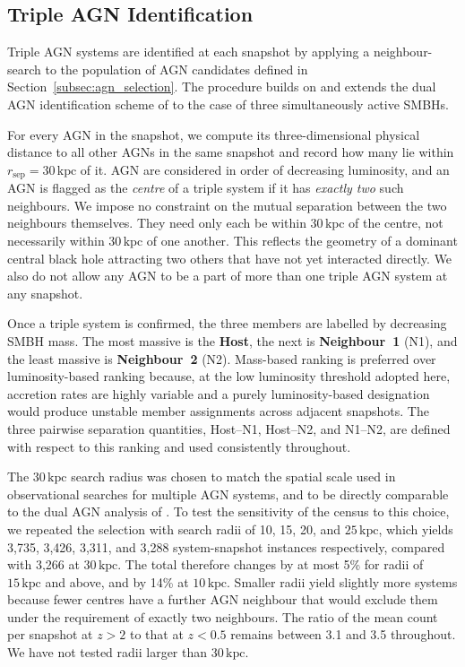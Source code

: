 \documentclass[twocolumn, 10pt]{article}
\begin{document}
\subsection{Triple AGN Identification}
\label{subsec:identification}

Triple AGN systems are identified at each snapshot by applying a neighbour-search to the population of AGN candidates defined in Section~\ref{subsec:agn_selection}. The procedure builds on and extends the dual AGN identification scheme of \citet{Saeedzadeh2024} to the case of three simultaneously active SMBHs.

For every AGN in the snapshot, we compute its three-dimensional physical distance to all other AGNs in the same snapshot and record how many lie within $r_\mathrm{sep} = 30\,\mathrm{kpc}$ of it. AGN are considered in order of decreasing luminosity, and an AGN is flagged as the \textit{centre} of a triple system if it has \textit{exactly two} such neighbours. We impose no constraint on the mutual separation between the two neighbours themselves. They need only each be within $30\,\mathrm{kpc}$ of the centre, not necessarily within $30\,\mathrm{kpc}$ of one another. This reflects the geometry of a dominant central black hole attracting two others that have not yet interacted directly. We also do not allow any AGN to be a part of more than one triple AGN system at any snapshot.

Once a triple system is confirmed, the three members are labelled by decreasing SMBH mass. The most massive is the \textbf{Host}, the next is \textbf{Neighbour~1} (N1), and the least massive is \textbf{Neighbour~2} (N2). Mass-based ranking is preferred over luminosity-based ranking because, at the low luminosity threshold adopted here, accretion rates are highly variable and a purely luminosity-based designation would produce unstable member assignments across adjacent snapshots. The three pairwise separation quantities, Host--N1, Host--N2, and N1--N2, are defined with respect to this ranking and used consistently throughout.

The $30\,\mathrm{kpc}$ search radius was chosen to match the spatial scale used in observational searches for multiple AGN systems, and to be directly comparable to the dual AGN analysis of \citet{Saeedzadeh2024}. To test the sensitivity of the census to this choice, we repeated the selection with search radii of 10, 15, 20, and $25\,\mathrm{kpc}$, which yields 3,735, 3,426, 3,311, and 3,288 system-snapshot instances respectively, compared with 3,266 at $30\,\mathrm{kpc}$. The total therefore changes by at most 5\% for radii of $15\,\mathrm{kpc}$ and above, and by 14\% at $10\,\mathrm{kpc}$. Smaller radii yield slightly more systems because fewer centres have a further AGN neighbour that would exclude them under the requirement of exactly two neighbours. The ratio of the mean count per snapshot at $z > 2$ to that at $z < 0.5$ remains between 3.1 and 3.5 throughout. We have not tested radii larger than $30\,\mathrm{kpc}$.
\end{document}
